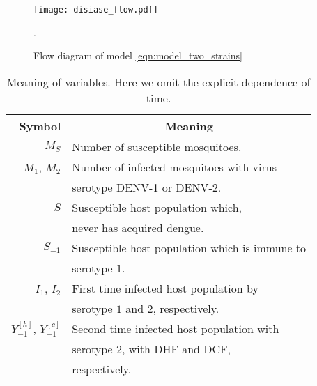 \begin{figure}[htb]
	\centering
	\texttt{[image: disiase\_flow.pdf]}
	\caption{Flow diagram of model \eqref{eqn:model_two_strains}}.
	\label{fig:disiaseflow}
\end{figure}
%
\begin{table*}[h!]
	\begin{center}
		\begin{tabular}{rl}
			\toprule
			Symbol		&	\multicolumn{1}{c}{Meaning}
			\\
			\midrule
			$M_S$
				& Number of susceptible mosquitoes.
			\\
			$M_1$, $M_2$
				&
				 Number of infected mosquitoes with virus
				\\
				& 
				serotype \ac{DENV-1} or \ac{DENV-2}.
			\\
			$S$
				&
				Susceptible host population which, 
				\\
				& never has acquired dengue.
			\\
			$S_{-1}$
			&
				Susceptible host population 
				which is immune to
			\\
			&
				serotype $1$.
			\\
			$I_1$, $I_2$
			&
				First time infected host population by 
			\\
				& serotype $1$ and $2$, respectively.
			\\
				$Y_{-1}^{[h]}$,
				$Y_{-1}^{[c]}$
				&
				Second time infected host population with 
				\\
				&
				serotype 2, with \ac{DHF} and \ac{DCF}, 
                \\
                &
                respectively.
			\\
		\bottomrule
		\end{tabular}
	\end{center}
	\caption{
		Meaning of variables. 
		Here we omit the explicit dependence of
		time.
	}\label{tbl:variable_description}
\end{table*}

